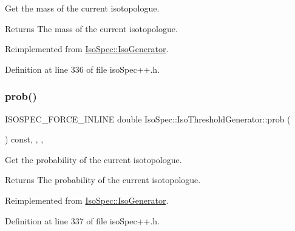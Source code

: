 Get the mass of the current isotopologue. 

\begin{DoxyReturn}{Returns}
The mass of the current isotopologue. 
\end{DoxyReturn}


Reimplemented from \mbox{\hyperlink{class_iso_spec_1_1_iso_generator_a34173228ef73e272e2ff0ae6ce58092d}{Iso\+Spec\+::\+Iso\+Generator}}.



Definition at line 336 of file iso\+Spec++.\+h.

\mbox{\label{class_iso_spec_1_1_iso_threshold_generator_a998d987f81b2ca7ed610294f6a5f8df5}} 
\subsubsection{\texorpdfstring{prob()}{prob()}}
{\footnotesize\ttfamily I\+S\+O\+S\+P\+E\+C\+\_\+\+F\+O\+R\+C\+E\+\_\+\+I\+N\+L\+I\+NE double Iso\+Spec\+::\+Iso\+Threshold\+Generator\+::prob (\begin{DoxyParamCaption}{ }\end{DoxyParamCaption}) const\hspace{0.3cm}{\ttfamily [inline]}, {\ttfamily [final]}, {\ttfamily [override]}, {\ttfamily [virtual]}}



Get the probability of the current isotopologue. 

\begin{DoxyReturn}{Returns}
The probability of the current isotopologue. 
\end{DoxyReturn}


Reimplemented from \mbox{\hyperlink{class_iso_spec_1_1_iso_generator_aecf1b3292fcc0857a86efe619a37fff0}{Iso\+Spec\+::\+Iso\+Generator}}.



Definition at line 337 of file iso\+Spec++.\+h.

\mbox{\label{class_iso_spec_1_1_iso_threshold_generator_ab830ffa21469df45a513ff1dcaf5d9e7}} 
